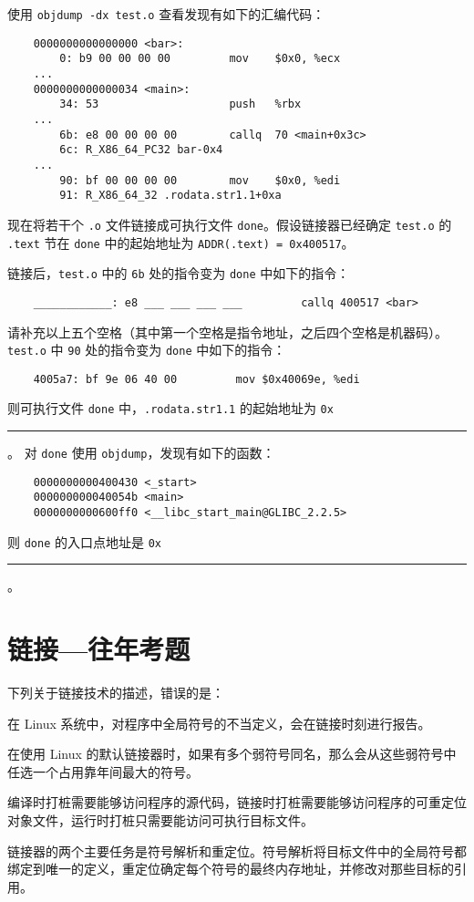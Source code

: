 \begin{problems}
        \qn 使用 \verb|objdump -dx test.o| 查看发现有如下的汇编代码：
        \begin{verbatim}
    0000000000000000 <bar>:
        0: b9 00 00 00 00         mov    $0x0, %ecx
    ...
    0000000000000034 <main>:
        34: 53                    push   %rbx
    ...
        6b: e8 00 00 00 00        callq  70 <main+0x3c>
        6c: R_X86_64_PC32 bar-0x4
    ...
        90: bf 00 00 00 00        mov    $0x0, %edi
        91: R_X86_64_32 .rodata.str1.1+0xa
        \end{verbatim}
        现在将若干个 \verb|.o| 文件链接成可执行文件 \verb|done|。假设链接器已经确定 \verb|test.o| 的 \verb|.text| 节在 \verb|done| 中的起始地址为 \verb|ADDR(.text) = 0x400517|。

        \subqn 链接后，\verb|test.o| 中的 \verb|6b| 处的指令变为 \verb|done| 中如下的指令：
        \begin{verbatim}
    ____________: e8 ___ ___ ___ ___         callq 400517 <bar>
        \end{verbatim}
        请补充以上五个空格（其中第一个空格是指令地址，之后四个空格是机器码）。
        \subqn \verb|test.o| 中 \verb|90| 处的指令变为 \verb|done| 中如下的指令：
        \begin{verbatim}
    4005a7: bf 9e 06 40 00         mov $0x40069e, %edi
        \end{verbatim}
        则可执行文件 \verb|done| 中，\verb|.rodata.str1.1| 的起始地址为 \verb|0x|\rule{2.5cm}{0.25mm}。
        \qn 对 \verb|done| 使用 \verb|objdump|，发现有如下的函数：
        \begin{verbatim}
    0000000000400430 <_start>
    000000000040054b <main>
    0000000000600ff0 <__libc_start_main@GLIBC_2.2.5>
        \end{verbatim}
        则 \verb|done| 的入口点地址是 \verb|0x|\rule{2.5cm}{0.25mm}。
    \end{problems}

\chapter{链接{---}往年考题}
    \begin{problems}
        \pro 下列关于链接技术的描述，错误的是：
        \begin{choices}
            \item 在 Linux 系统中，对程序中全局符号的不当定义，会在链接时刻进行报告。
            \item 在使用 Linux 的默认链接器时，如果有多个弱符号同名，那么会从这些弱符号中任选一个占用靠年间最大的符号。
            \item 编译时打桩需要能够访问程序的源代码，链接时打桩需要能够访问程序的可重定位对象文件，运行时打桩只需要能访问可执行目标文件。
            \item 链接器的两个主要任务是符号解析和重定位。符号解析将目标文件中的全局符号都绑定到唯一的定义，重定位确定每个符号的最终内存地址，并修改对那些目标的引用。
        \end{choices}
    \end{problems}